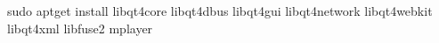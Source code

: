 sudo apt\PYZhy{}get install libqt4\PYZhy{}core libqt4\PYZhy{}dbus
    libqt4\PYZhy{}gui libqt4\PYZhy{}network
    libqt4\PYZhy{}webkit libqt4\PYZhy{}xml
    libfuse2 mplayer

